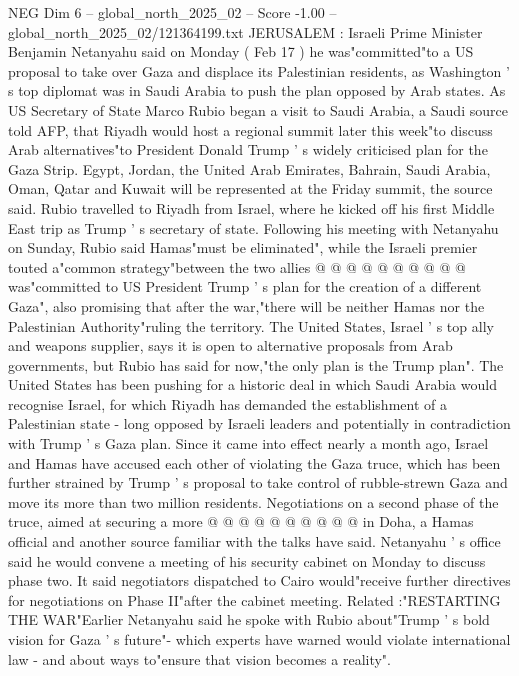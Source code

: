 \begin{textsample}{NEG Dim 6 – global\_north\_2025\_02 – Score -1.00 – global\_north\_2025\_02/121364199.txt}  \label{ex:f6_neg_113}
JERUSALEM : Israeli Prime Minister Benjamin Netanyahu said on Monday ( Feb 17 ) he was"committed"to a US proposal to take over Gaza and displace its Palestinian residents, as Washington ' s top diplomat was in Saudi Arabia to push the plan opposed by Arab states.
As US Secretary of State Marco Rubio began a visit to Saudi Arabia, a Saudi source told AFP, that Riyadh would host a regional summit later this week"to discuss Arab alternatives"to President Donald Trump ' s widely criticised plan for the Gaza Strip.
Egypt, Jordan, the United Arab Emirates, Bahrain, Saudi Arabia, Oman, Qatar and Kuwait will be represented at the Friday summit, the source said.
Rubio travelled to Riyadh from Israel, where he kicked off his first Middle East trip as Trump ' s secretary of state.
Following his meeting with Netanyahu on Sunday, Rubio said Hamas"must be eliminated", while the Israeli premier touted a"common strategy"between the two allies @ @ @ @ @ @ @ @ @ @ was"committed to US President Trump ' s plan for the creation of a different Gaza", also promising that after the war,"there will be neither Hamas nor the Palestinian Authority"ruling the territory.
The United States, Israel ' s top ally and weapons supplier, says it is open to alternative proposals from Arab governments, but Rubio has said for now,"the only plan is the Trump plan".
The United States has been pushing for a historic deal in which Saudi Arabia would recognise Israel, for which Riyadh has demanded the establishment of a Palestinian state - long opposed by Israeli leaders and potentially in contradiction with Trump ' s Gaza plan.
Since it came into effect nearly a month ago, Israel and Hamas have accused each other of violating the Gaza truce, which has been further strained by Trump ' s proposal to take control of rubble-strewn Gaza and move its more than two million residents.
Negotiations on a second phase of the truce, aimed at securing a more @ @ @ @ @ @ @ @ @ @ in Doha, a Hamas official and another source familiar with the talks have said.
Netanyahu ' s office said he would convene a meeting of his security cabinet on Monday to discuss phase two.
It said negotiators dispatched to Cairo would"receive further directives for negotiations on Phase II"after the cabinet meeting.
Related :"RESTARTING THE WAR"Earlier Netanyahu said he spoke with Rubio about"Trump ' s bold vision for Gaza ' s future"- which experts have warned would violate international law - and about ways to"ensure that vision becomes a reality".

\end{textsample}
